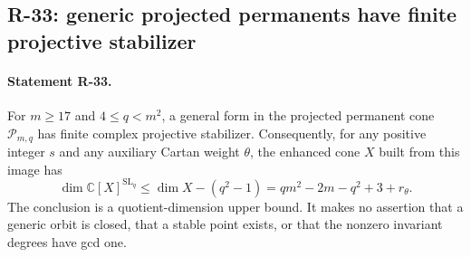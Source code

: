 \subsection{R-33: generic projected permanents have finite projective stabilizer}

\paragraph{Statement R-33.}
For $m\geq17$ and $4\leq q<m^2$, a general form in the
projected permanent cone $\mathcal P_{m,q}$ has finite complex
projective stabilizer. Consequently, for any positive integer
$s$ and any auxiliary Cartan weight $\theta$, the enhanced
cone $X$ built from this image has
\begin{equation}\label{R33:quotient_upper}
 \dim\mathbb C[X]^{\mathrm{SL}_q}
 \leq \dim X-(q^2-1)
 =q m^2-2m-q^2+3+r_\theta.
\end{equation}
The conclusion is a quotient-dimension upper bound. It makes
no assertion that a generic orbit is closed, that a stable
point exists, or that the nonzero invariant degrees have gcd
one.

